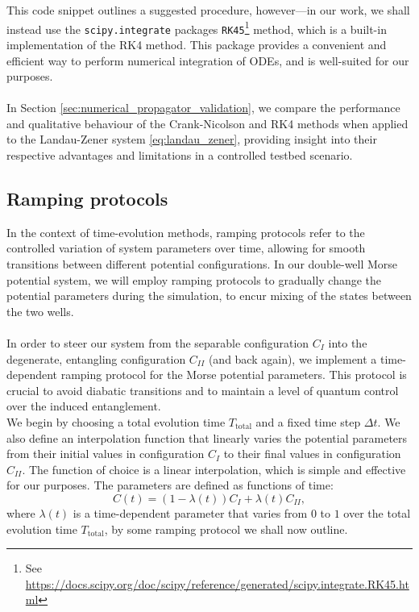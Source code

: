 \documentclass{subfiles}
\begin{document}
This code snippet outlines a suggested procedure, however—in our work, we shall instead use the \texttt{scipy.integrate} packages \texttt{RK45}\footnote{See \url{https://docs.scipy.org/doc/scipy/reference/generated/scipy.integrate.RK45.html}} method, which is a built-in implementation of the RK4 method. This package provides a convenient and efficient way to perform numerical integration of ODEs, and is well-suited for our purposes.  \\\\
In Section \ref{sec:numerical_propagator_validation}, we compare the performance and qualitative behaviour of the Crank-Nicolson and RK4 methods when applied to the Landau-Zener system \eqref{eq:landau_zener}, providing insight into their respective advantages and limitations in a controlled testbed scenario.

\subsection{Ramping protocols}\label{sec:ramping_protocols}
In the context of time-evolution methods, ramping protocols refer to the controlled variation of system parameters over time, allowing for smooth transitions between different potential configurations. In our double-well Morse potential system, we will employ ramping protocols to gradually change the potential parameters during the simulation, to encur mixing of the states between the two wells. \\\\
In order to steer our system from the separable configuration $C_I$ into the degenerate, entangling configuration $C_{II}$ (and back again), we implement a time-dependent ramping protocol for the Morse potential parameters. This protocol is crucial to avoid diabatic transitions and to maintain a level of quantum control over the induced entanglement.
\\
We begin by choosing a total evolution time $T_\text{total}$ and a fixed time step $\Delta t$. We also define an interpolation function that linearly varies the potential parameters from their initial values in configuration $C_I$ to their final values in configuration $C_{II}$. The function of choice is a linear interpolation, which is simple and effective for our purposes. The parameters are defined as functions of time:
\begin{equation}
    C(t) = (1 - \lambda(t))C_I + \lambda(t)C_{II}\label{eq:interpolation_function},
\end{equation}
where $\lambda(t)$ is a time-dependent parameter that varies from $0$ to $1$ over the total evolution time $T_\text{total}$, by some ramping protocol we shall now outline.\\
\end{document}
